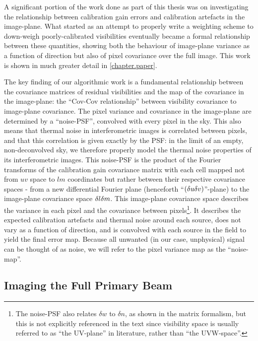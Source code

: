 \pg
A significant portion of the work done as part of this thesis was on investigating the relationship between calibration gain errors and calibration artefacts in the image-plane. What started as an attempt to properly write a weighting scheme to down-weigh poorly-calibrated visibilities eventually became a formal relationship between these quantities, showing both the behaviour of image-plane variance as a function of direction but also of pixel covariance over the full image. This work is shown in much greater detail in \cref{chapter.paper}.

\pg
The key finding of our algorithmic work is a fundamental relationship between the covariance matrices of residual visibilities and the map of the covariance in the image-plane: the ``Cov-Cov relationship'' between visibility covariance to image-plane covariance. The pixel variance and covariance in the image-plane are determined by a ``noise-PSF'', convolved with every pixel in the sky. This also means that thermal noise in interferometric images is correlated between pixels, and that this correlation is given exactly by the PSF: in the limit of an empty, non-deconvolved sky, we therefore properly model the thermal noise properties of its interferometric images. This noise-PSF is the product of the Fourier transforms of the calibration gain covariance matrix with each cell mapped not from $uv$ space to $lm$ coordinates but rather between their respective covariance spaces - from a new {differential Fourier plane (henceforth ``$\left(\delta u\delta v\right)$''-plane) to the image-plane covariance space $\delta l\delta m$. This image-plane covariance space describes} the variance in each pixel and the covariance between pixels\footnote{{The noise-PSF also relates $\delta w$ to $\delta n$, as shown in the matrix formalism, but this is not explicitly referenced in the text since visibility space is usually referred to as ``the UV-plane'' in literature, rather than ``the UVW-space''.}}. It describes the expected calibration artefacts and thermal noise around each source, does not vary as a function of direction, and is convolved with each source in the field to yield the final error map. Because all unwanted (in our case, unphysical) signal can be thought of as noise, we will refer to {the pixel variance map} as the ``noise-map''.


\subsection{Imaging the Full Primary Beam}


